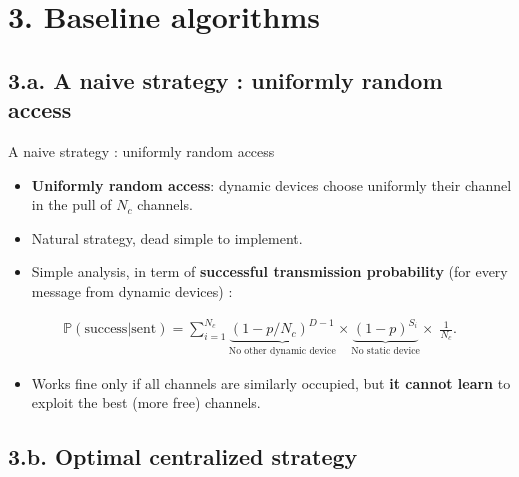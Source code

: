 \documentclass[12pt,english,ignorenonframetext,]{beamer}
\providecommand{\tightlist}{%
  \setlength{\itemsep}{0pt}\setlength{\parskip}{0pt}}
\begin{document}
\section{\hfill{}3. Baseline algorithms\hfill{}}

\subsection{\hfill{}3.a. A naive strategy : uniformly random access\hfill{}}

\begin{frame}{A naive strategy : uniformly random access}

\begin{itemize}
\tightlist
\item
  \textbf{Uniformly random access}: dynamic devices choose uniformly
  their channel in the pull of \(N_c\) channels.
\item
  Natural strategy, dead simple to implement.
\end{itemize}

\pause

\begin{itemize}
\tightlist
\item
  Simple analysis, in term of \textbf{successful transmission
  probability} (for every message from dynamic devices) :
\end{itemize}

\begin{small} \begin{align*}
\mathbb{P}(\text{success}|\text{sent}) = \sum_{i=1}^{N_c} \underbrace{(1 - p / N_c)^{D-1}}_{\text{No other dynamic device}} \times \underbrace{(1-p)^{S_i}}_{\text{No static device}} \times\; \frac{1}{N_c}.
\end{align*} \end{small}

\pause

\begin{itemize}
\tightlist
\item
  Works fine only if all channels are similarly occupied,\newline
   but \textbf{it cannot learn} to exploit the best (more free)
  channels.
\end{itemize}

\end{frame}



\subsection{\hfill{}3.b. Optimal centralized strategy\hfill{}}
\end{document}
